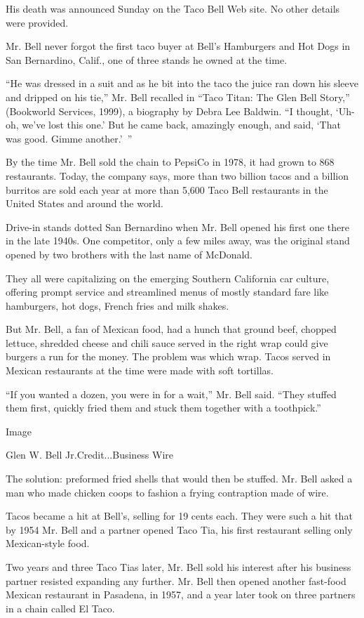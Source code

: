 His death was announced Sunday on the Taco Bell Web site. No other
details were provided.

Mr. Bell never forgot the first taco buyer at Bell's Hamburgers and Hot
Dogs in San Bernardino, Calif., one of three stands he owned at the
time.

``He was dressed in a suit and as he bit into the taco the juice ran
down his sleeve and dripped on his tie,'' Mr. Bell recalled in ``Taco
Titan: The Glen Bell Story,'' (Bookworld Services, 1999), a biography by
Debra Lee Baldwin. ``I thought, `Uh-oh, we've lost this one.' But he
came back, amazingly enough, and said, `That was good. Gimme
another.'~''

By the time Mr. Bell sold the chain to PepsiCo in 1978, it had grown to
868 restaurants. Today, the company says, more than two billion tacos
and a billion burritos are sold each year at more than 5,600 Taco Bell
restaurants in the United States and around the world.

Drive-in stands dotted San Bernardino when Mr. Bell opened his first one
there in the late 1940s. One competitor, only a few miles away, was the
original stand opened by two brothers with the last name of McDonald.

They all were capitalizing on the emerging Southern California car
culture, offering prompt service and streamlined menus of mostly
standard fare like hamburgers, hot dogs, French fries and milk shakes.

But Mr. Bell, a fan of Mexican food, had a hunch that ground beef,
chopped lettuce, shredded cheese and chili sauce served in the right
wrap could give burgers a run for the money. The problem was which wrap.
Tacos served in Mexican restaurants at the time were made with soft
tortillas.

``If you wanted a dozen, you were in for a wait,'' Mr. Bell said. ``They
stuffed them first, quickly fried them and stuck them together with a
toothpick.''

Image

Glen W. Bell Jr.Credit...Business Wire

The solution: preformed fried shells that would then be stuffed. Mr.
Bell asked a man who made chicken coops to fashion a frying contraption
made of wire.

Tacos became a hit at Bell's, selling for 19 cents each. They were such
a hit that by 1954 Mr. Bell and a partner opened Taco Tia, his first
restaurant selling only Mexican-style food.

Two years and three Taco Tias later, Mr. Bell sold his interest after
his business partner resisted expanding any further. Mr. Bell then
opened another fast-food Mexican restaurant in Pasadena, in 1957, and a
year later took on three partners in a chain called El Taco.

